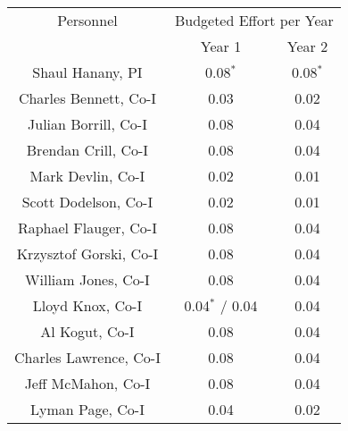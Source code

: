 %
%
%
%
%
%


\begin{table}[h] %
\begin{center}
\begin{tabular}{|c|c|c|} \hline 
Personnel & \multicolumn{2}{c|}{Budgeted Effort per Year}  \\ \cline{2-3}
                & Year 1  & Year 2   \\ \hline
Shaul Hanany,  PI            & 0.08$^*$  & 0.08$^*$   \\ \hline
Charles Bennett, Co-I        & 0.03 & 0.02   \\ \hline
Julian Borrill, Co-I         & 0.08 & 0.04   \\ \hline
Brendan Crill, Co-I          & 0.08 & 0.04   \\ \hline
Mark Devlin, Co-I            & 0.02 & 0.01   \\ \hline
Scott Dodelson, Co-I         & 0.02 & 0.01   \\ \hline
Raphael Flauger, Co-I        & 0.08 & 0.04   \\ \hline
Krzysztof Gorski, Co-I       & 0.08 & 0.04   \\ \hline
William Jones, Co-I          & 0.08 & 0.04   \\ \hline
Lloyd Knox, Co-I            & 0.04$^*$ / 0.04 &  0.04   \\ \hline
Al Kogut, Co-I               & 0.08 & 0.04   \\ \hline
Charles Lawrence, Co-I       & 0.08 & 0.04   \\ \hline
Jeff McMahon, Co-I           & 0.08 & 0.04   \\ \hline
Lyman Page, Co-I             & 0.04 & 0.02   \\ \hline

\end{tabular}
\end{center}
\end{table}
